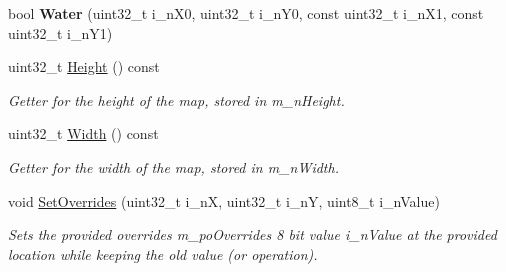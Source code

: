 \begin{DoxyCompactItemize}
\item 
\mbox{\label{classplanner_1_1c_graph_aeea8bc45a6aec3d078a7d1491e2e9b15}} 
bool {\bfseries Water} (uint32\+\_\+t i\+\_\+n\+X0, uint32\+\_\+t i\+\_\+n\+Y0, const uint32\+\_\+t i\+\_\+n\+X1, const uint32\+\_\+t i\+\_\+n\+Y1)
\item 
uint32\+\_\+t \mbox{\hyperlink{classplanner_1_1c_graph_a1e79d6d55c0f3d705b38a6cb6e8301ad}{Height}} () const
\begin{DoxyCompactList}\small\item\em Getter for the height of the map, stored in m\+\_\+n\+Height. \end{DoxyCompactList}\item 
uint32\+\_\+t \mbox{\hyperlink{classplanner_1_1c_graph_a320e1e36202834101489773c22b432c4}{Width}} () const
\begin{DoxyCompactList}\small\item\em Getter for the width of the map, stored in m\+\_\+n\+Width. \end{DoxyCompactList}\item 
void \mbox{\hyperlink{classplanner_1_1c_graph_af39f6d15624206b77d09c0ea420186e1}{Set\+Overrides}} (uint32\+\_\+t i\+\_\+nX, uint32\+\_\+t i\+\_\+nY, uint8\+\_\+t i\+\_\+n\+Value)
\begin{DoxyCompactList}\small\item\em Sets the provided overrides m\+\_\+po\+Overrides 8 bit value i\+\_\+n\+Value at the provided location while keeping the old value (or operation). \end{DoxyCompactList}\end{DoxyCompactItemize}
